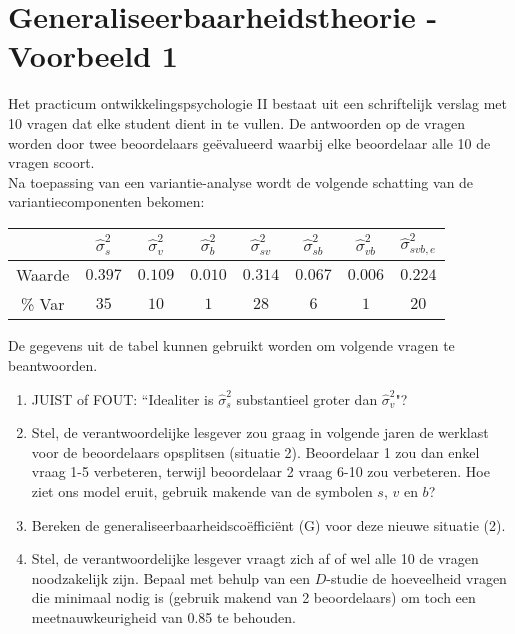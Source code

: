 
\OPGAVE
{
\section{Generaliseerbaarheidstheorie - Voorbeeld 1}

Het practicum ontwikkelingspsychologie II bestaat uit een schriftelijk verslag met 10 vragen dat elke student dient in te vullen. De antwoorden op de vragen worden door twee beoordelaars ge\"{e}valueerd waarbij elke beoordelaar alle 10 de vragen scoort.\\
Na toepassing van een variantie-analyse wordt de volgende schatting van de variantiecomponenten bekomen:

\begin{center}
\renewcommand{\arraystretch}{1.2}
\begin{tabular}{|c|c|c|c|c|c|c|c|} \hline
 & $ \hat{\sigma}^2_{s} $ & $ \hat{\sigma}^2_{v} $& $ \hat{\sigma}^2_{b} $ & $ \hat{\sigma}^2_{sv} $ & $ \hat{\sigma}^2_{sb} $ & $ \hat{\sigma}^2_{vb} $ & $ \hat{\sigma}^2_{svb,e} $ \\ \hline
Waarde  & $ 0.397 $ & $ 0.109 $ & $ 0.010 $ & $ 0.314 $ & $ 0.067 $ & $ 0.006 $ & $ 0.224 $ \\
\% Var & $ 35 $ & $ 10 $ & $ 1 $ & $ 28 $ & $ 6 $ & $ 1 $ & $ 20 $ \\ \hline
\end{tabular}
\end{center}


\normalsize
De gegevens uit de tabel kunnen gebruikt worden om volgende vragen te beantwoorden.

\begin{enumerate}
\item JUIST of FOUT: ``Idealiter is $ \hat{\sigma}^2_{s} $ substantieel groter dan $ \hat{\sigma}^2_{v}$"?
\item Stel, de verantwoordelijke lesgever zou graag in volgende jaren de werklast voor de beoordelaars opsplitsen (situatie 2).
Beoordelaar 1 zou dan enkel vraag 1-5 verbeteren, terwijl beoordelaar 2 vraag 6-10 zou verbeteren.
Hoe ziet ons model eruit, gebruik makende van de symbolen $s$, $v$ en $b$?
\item Bereken de generaliseerbaarheidsco\"{e}ffici\"{e}nt (G) voor deze nieuwe situatie (2).

\item Stel, de verantwoordelijke lesgever vraagt zich af of wel alle 10 de vragen noodzakelijk zijn. Bepaal met behulp van een $D$-studie de hoeveelheid vragen die minimaal nodig is (gebruik makend van 2 beoordelaars) om toch een meetnauwkeurigheid van 0.85 te behouden.

\end{enumerate}
}

